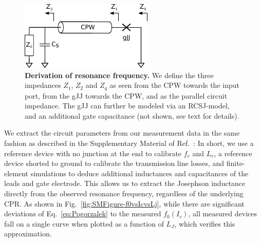 \begin{figure}
	\centering
	\includegraphics[width=0.5\linewidth]{chapter-gJJ-CPR/figs/rfderivation}
	\caption{
		\textbf{Derivation of resonance frequency.}
		We define the three impedances $Z_1$, $Z_2$ and $Z_q$ as seen from the CPW towards the input port, from the gJJ towards the CPW, and as the parallel circuit impedance.
		The gJJ can further be modeled via an RCSJ-model, and an additional gate capacitance (not shown, see text for details).
	}
	\label{fig:rfderivation}
\end{figure}


We extract the circuit parameters from our measurement data in the same fashion as described in the Supplementary Material of Ref.~\cite{schmidtBallisticGrapheneSuperconducting2018}:
%
In short, we use a reference device with no junction at the end to calibrate $f_r$ and $L_r$, a reference device shorted to ground to calibrate the transmission line losses, and finite-element simulations to deduce additional inductances and capacitances of the leads and gate electrode.
%
This allows us to extract the Josephson inductance directly from the observed resonance frequency, regardless of the underlying CPR.
%
As shown in Fig.~\ref{fig:SMFigure-f0vsIcvsLj}, while there are significant deviations of Eq.~\ref{eq:Pogorzalek} to the measured $f_0(I_c)$, all measured devices fall on a single curve when plotted as a function of $L_J$, which verifies this approximation.

